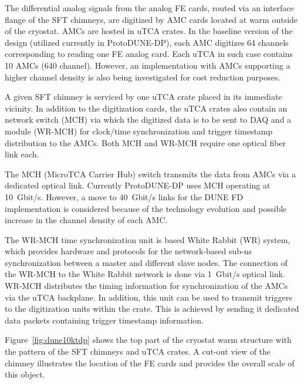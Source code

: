 The differential analog signals from the analog FE cards, routed via an interface flange of the SFT chimneys, are digitized by AMC cards located at warm outside of the cryostat. AMCs are hosted in uTCA crates. In the baseline version of the design (utilized currently in ProtoDUNE-DP), each AMC digitizes \num{64} channels corresponding to reading one FE analog card. Each uTCA in such case contains \num{10} AMCs (\num{640} channel). However, an implementation with AMCs supporting a higher channel density is also being investigated for cost reduction purposes. 


A given SFT chimney is serviced by one uTCA crate placed in its immediate vicinity. In addition to the digitization cards, the uTCA crates also contain an network switch (MCH) via which the digitized data is to be sent to DAQ and a module (WR-MCH) for clock/time synchronization and trigger timestamp distribution to the AMCs. Both MCH and WR-MCH require one optical fiber link each. 

The MCH (MicroTCA Carrier Hub) switch transmits the data from AMCs via a dedicated optical link. Currently ProtoDUNE-DP uses MCH operating at \SI{10}{Gbit/s}. However, a move to \SI{40}{Gbit/s} links for the DUNE FD implementation is considered because of the technology evolution and possible increase in the channel density of each AMC.

The WR-MCH time synchronization unit is based White Rabbit (WR) system, which provides hardware and protocols for the network-based sub-ns synchronization between a master and different slave nodes. The connection of the WR-MCH to the White Rabbit network is done via \SI{1}{Gbit/s} optical link. WR-MCH distributes the timing information for synchronization of the AMCs via the uTCA backplane. In addition, this unit can be used to transmit triggers to the digitization units within the crate. This is achieved by sending it dedicated data packets containing trigger timestamp information. 

Figure~\ref{fig:dune10ktdp} shows the top part of the cryostat warm structure with the pattern of the SFT chimneys and uTCA crates. A cut-out view of the chimney illustrates the location of the FE cards and provides the overall scale of this object. 


